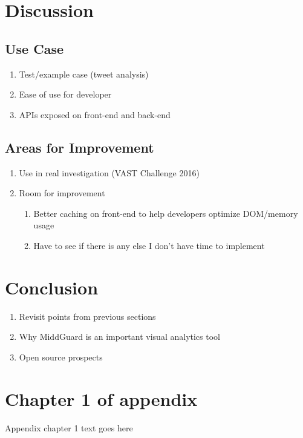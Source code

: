 \documentclass[midd]{thesis}
\begin{document}
\chapter{Discussion}

\section{Use Case}

\begin{enumerate}
  \item Test/example case (tweet analysis)
  \item Ease of use for developer
  \item APIs exposed on front-end and back-end
\end{enumerate}

\section{Areas for Improvement}

\begin{enumerate}
  \item Use in real investigation (VAST Challenge 2016)
  \item Room for improvement
  \begin{enumerate}
    \item Better caching on front-end to help developers optimize DOM/memory
    usage
    \item Have to see if there is any else I don't have time to implement
  \end{enumerate}
\end{enumerate}

\chapter{Conclusion}
  \begin{enumerate}
    \item Revisit points from previous sections
    \item Why MiddGuard is an important visual analytics tool
    \item Open source prospects
  \end{enumerate}

\appendix
\chapter{Chapter 1 of appendix}
Appendix chapter 1 text goes here


\end{document}
